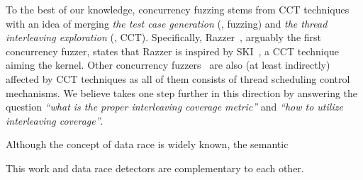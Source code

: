 To the best of our knowledge, concurrency fuzzing stems from CCT
techniques with an idea of merging \textit{the test case generation}
(\ie, fuzzing) and \textit{the thread interleaving exploration} (\ie,
CCT).
%
Specifically, Razzer~\cite{razzer}, arguably the first concurrency
fuzzer, states that Razzer is inspired by SKI~\cite{ski}, a CCT
technique aiming the kernel.
%
Other concurrency fuzzers~\cite{krace, muzz, snowboard, conzzer} are
also (at least indirectly) affected by CCT techniques as all of them
consists of thread scheduling control mechanisms.
%
We believe \sys takes one step further in this direction by answering
the question \textit{``what is the proper interleaving coverage
  metric''} and \textit{``how to utilize interleaving coverage''}.



%

\cite{lkmm, linuxmemorymodel}

Although the concept of data race is widely known, the semantic

This work and data race detectors are complementary to each other.
%




